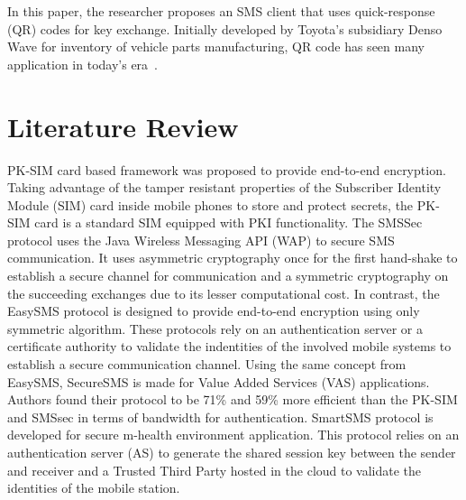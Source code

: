 \documentclass[journal]{./IEEE/IEEEtran}
\begin{document}
In this paper, the researcher proposes an SMS client that uses 
quick-response (QR) codes for key exchange. Initially developed by Toyota's
subsidiary Denso Wave for inventory of vehicle parts manufacturing,
QR code has seen many application in today's era~\cite{Tiwari_2016}.
 



\section{Literature Review}
PK-SIM \cite{PKSIMcard07} card based framework  was proposed to 
provide end-to-end encryption. 
Taking advantage of the tamper resistant properties of the Subscriber Identity Module (SIM) card inside  mobile phones to store and protect secrets, the PK-SIM card is a standard SIM equipped with PKI functionality.
The SMSSec \cite{SMSSec08} protocol uses the Java Wireless Messaging API (WAP) to secure SMS communication.
It uses asymmetric cryptography once for the first hand-shake to establish a secure channel for communication and a symmetric cryptography on the succeeding exchanges due to its lesser computational cost. In contrast, the EasySMS \cite{EasySMS14} protocol is designed to provide end-to-end encryption using only symmetric algorithm. 
These protocols rely on an authentication server or a certificate authority to validate the indentities of the involved mobile systems to establish a secure communication channel. 
Using the same concept from EasySMS, SecureSMS \cite{SecureSMS14} is made for Value Added Services (VAS) applications. Authors found their protocol to be 71\% and 59\% more efficient than the PK-SIM and SMSsec in terms of bandwidth for authentication. 
SmartSMS \cite{SmartSMS16} protocol is developed for secure m-health environment application. This protocol relies on an authentication server (AS) to generate the shared session key between the sender and receiver and a Trusted Third Party hosted in the cloud to validate the identities of the mobile station.  

\end{document}
